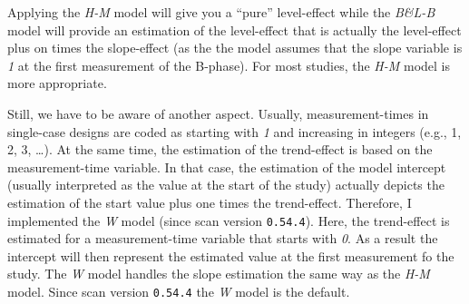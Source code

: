 \documentclass[
  letterpaper,
  DIV=11,
  numbers=noendperiod]{scrreprt}
\begin{document}
Applying the \emph{H-M} model will give you a ``pure'' level-effect
while the \emph{B\&L-B} model will provide an estimation of the
level-effect that is actually the level-effect plus on times the
slope-effect (as the the model assumes that the slope variable is
\emph{1} at the first measurement of the B-phase). For most studies, the
\emph{H-M} model is more appropriate.

Still, we have to be aware of another aspect. Usually, measurement-times
in single-case designs are coded as starting with \emph{1} and
increasing in integers (e.g., 1, 2, 3, \ldots). At the same time, the
estimation of the trend-effect is based on the measurement-time
variable. In that case, the estimation of the model intercept (usually
interpreted as the value at the start of the study) actually depicts the
estimation of the start value plus one times the trend-effect.
Therefore, I implemented the \emph{W} model (since scan version
\texttt{0.54.4}). Here, the trend-effect is estimated for a
measurement-time variable that starts with \emph{0}. As a result the
intercept will then represent the estimated value at the first
measurement fo the study. The \emph{W} model handles the slope
estimation the same way as the \emph{H-M} model. Since scan version
\texttt{0.54.4} the \emph{W} model is the default.
\end{document}
